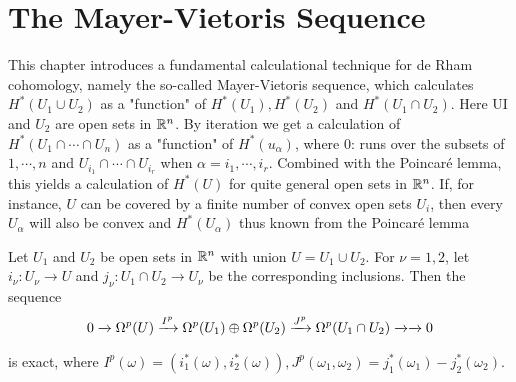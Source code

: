 \chapter{The Mayer-Vietoris Sequence}
This chapter introduces a fundamental calculational technique for de Rham
cohomology, namely the so-called Mayer-Vietoris sequence, which calculates
$H^*(U_1\cup U_2)$ as a "function" of $H^*(U_1), H^*(U_2)$ and $H^*(U_1\cap U_2)$. Here UI and
$U_2$ are open sets in $\mathbb{R}^n$. By iteration we get a calculation of $H^*(U_1\cap\cdots\cap U_n)$ as
a "function" of $H^*(u_\alpha)$, where 0: runs over the subsets of ${1,\cdots, n}$ and 
$U_{i_1}\cap\cdots\cap U_{i_r}$ when $\alpha = {i_1,\cdots, i_r }$. Combined with the Poincar\'e lemma, this
yields a  calculation of $H^*(U)$ for quite general open sets in $\mathbb{R}^n$. If, for
instance, $U$ can be covered by a finite number of convex open sets $U_i$, then every
$U_\alpha$ will also be convex and $H^*(U_\alpha)$ thus known from the Poincar\'e lemma


\begin{theorem}\label{theorem:5-1}
Let $U_1$ and $U_2$ be open sets in $\mathbb{R}^n$ with union $U = U_1\cup U_2$. For $\nu = 1, 2$, let 
$i_\nu: U_\nu\to U$ and $j_\nu:U_1\cap U_2\to U_\nu$ be the corresponding inclusions. Then the sequence
\begin{align*}
  0\xrightarrow[]{}\Omega^p(U)\xrightarrow[]{I^p}\Omega^p(U_1)\oplus\Omega^p(U_2)\xrightarrow[]{J^p}\Omega^p(U_1\cap U_2)\xrightarrow[]{}\xrightarrow[]{}0
\end{align*}

is exact, where $I^p(\omega) = (i^*_1(\omega), i^*_2(\omega)), J^p(\omega_1, \omega_2) = j^*_1(\omega_1) - j^*_2(\omega_2)$.
\end{theorem}

